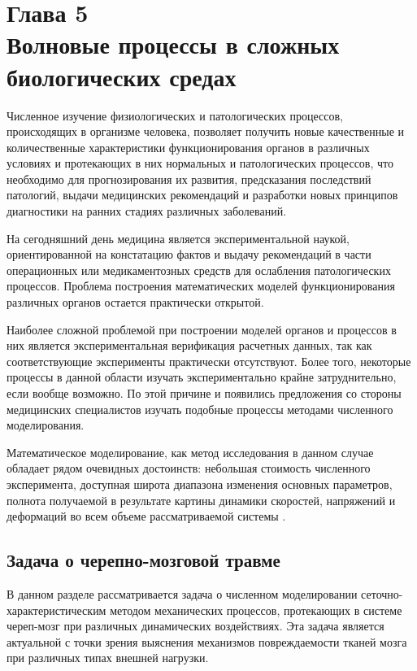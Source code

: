 \section*{Глава 5\\Волновые процессы в сложных биологических средах}
\setcounter{section}{5}
\setcounter{subsection}{0}
\setcounter{equation}{0}

Численное изучение физиологических и патологических процессов, происходящих в организме человека, позволяет получить новые качественные и количественные характеристики функционирования органов в различных условиях и протекающих в них нормальных и патологических процессов, что необходимо для прогнозирования их развития, предсказания последствий патологий, выдачи медицинских рекомендаций и разработки новых принципов диагностики на ранних стадиях различных заболеваний.

На сегодняшний день медицина является экспериментальной наукой, ориентированной на констатацию фактов и выдачу рекомендаций в части операционных или медикаментозных средств для ослабления патологических процессов. Проблема построения математических моделей функционирования различных органов остается практически открытой.

Наиболее сложной проблемой при построении моделей органов и процессов в них является экспериментальная верификация расчетных данных, так как соответствующие эксперименты практически отсутствуют. Более того, некоторые процессы в данной области изучать экспериментально крайне затруднительно, если вообще возможно. По этой причине и появились предложения со стороны медицинских специалистов изучать подобные процессы методами численного моделирования.

Математическое моделирование, как метод исследования в данном случае обладает рядом очевидных достоинств: небольшая стоимость численного эксперимента, доступная широта диапазона изменения основных параметров, полнота получаемой в результате картины динамики скоростей, напряжений и деформаций во всем объеме рассматриваемой системы \cite{petrov_biomech_2003}.

\clearpage
\newpage

\subsection{Задача о черепно-мозговой травме}

В данном разделе рассматривается задача о численном моделировании сеточно-характеристическим методом механических процессов, протекающих в системе череп-мозг при различных динамических воздействиях. Эта задача является актуальной с точки зрения выяснения механизмов повреждаемости тканей мозга при различных типах внешней нагрузки.

